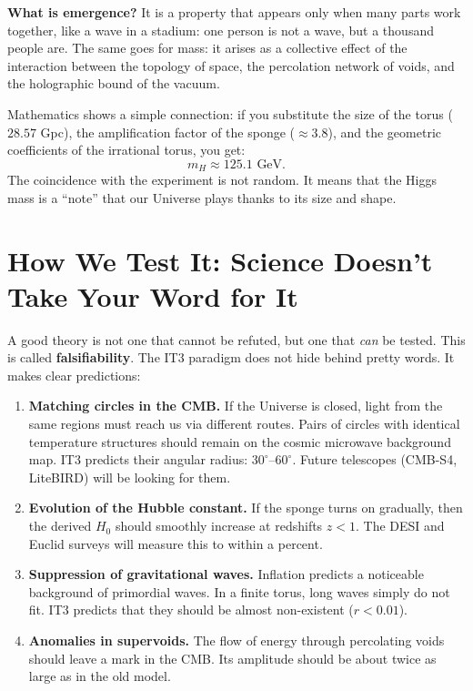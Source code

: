 \documentclass[12pt,a4paper,oneside]{book}
\begin{document}
\textbf{What is emergence?} It is a property that appears only when many parts work together, like a wave in a stadium: one person is not a wave, but a thousand people are. The same goes for mass: it arises as a collective effect of the interaction between the topology of space, the percolation network of voids, and the holographic bound of the vacuum.

Mathematics shows a simple connection: if you substitute the size of the torus ($28.57$ Gpc), the amplification factor of the sponge ($\approx 3.8$), and the geometric coefficients of the irrational torus, you get:
\[
m_H \approx 125.1 \text{ GeV}.
\]
The coincidence with the experiment is not random. It means that the Higgs mass is a “note” that our Universe plays thanks to its size and shape.

\chapter{How We Test It: Science Doesn't Take Your Word for It}

A good theory is not one that cannot be refuted, but one that \textit{can} be tested. This is called \textbf{falsifiability}. The IT3 paradigm does not hide behind pretty words. It makes clear predictions:

\begin{enumerate}
    \item \textbf{Matching circles in the CMB.} If the Universe is closed, light from the same regions must reach us via different routes. Pairs of circles with identical temperature structures should remain on the cosmic microwave background map. IT3 predicts their angular radius: $30^\circ$–$60^\circ$. Future telescopes (CMB-S4, LiteBIRD) will be looking for them.
    
    \item \textbf{Evolution of the Hubble constant.} If the sponge turns on gradually, then the derived $H_0$ should smoothly increase at redshifts $z < 1$. The DESI and Euclid surveys will measure this to within a percent.
    
    \item \textbf{Suppression of gravitational waves.} Inflation predicts a noticeable background of primordial waves. In a finite torus, long waves simply do not fit. IT3 predicts that they should be almost non-existent ($r < 0.01$).
    
    \item \textbf{Anomalies in supervoids.} The flow of energy through percolating voids should leave a mark in the CMB. Its amplitude should be about twice as large as in the old model.
\end{enumerate}
\end{document}
